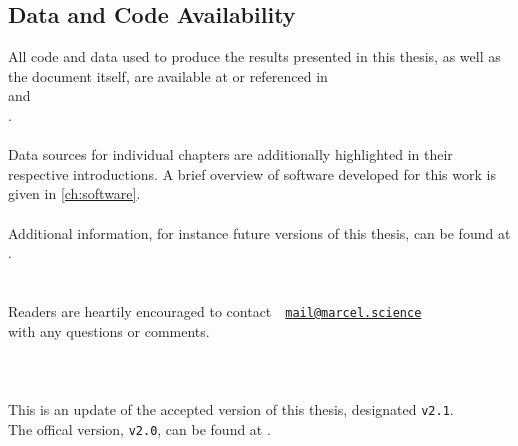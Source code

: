 \subsection{Data and Code Availability}
All code and data used to produce the results presented in this thesis, as well as the document itself, are available at or referenced in\\
 and \\
.
\\\\
Data sources for individual chapters are additionally highlighted in their respective introductions. A brief overview of software developed for this work is given in \cref{ch:software}.
\\\\
Additional information, for instance future versions of this thesis, can be found at .\\
\\\\
Readers are heartily encouraged to contact~~\href{mailto:mail@marcel.science}{\texttt{mail@marcel.science}}\\
with any questions or comments.
\\\\\\\\
{\footnotesize This is an update of the accepted version of this thesis, designated \texttt{v2.1}.\\
The offical version, \texttt{v2.0}, can be found at .}
